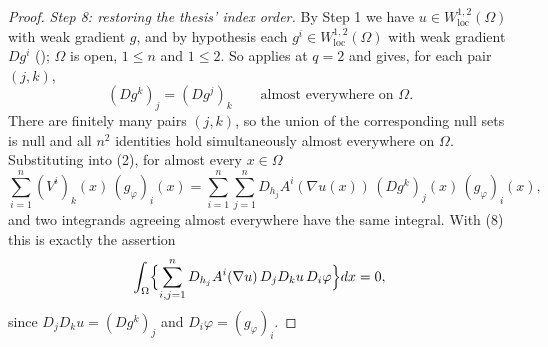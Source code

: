 \begin{proof}
\emph{Step 8: restoring the thesis' index order.}  By Step 1 we have
$u\in W^{1,2}_{\mathrm{loc}}(\Omega)$ with weak gradient $g$, and by hypothesis
each $g^i\in W^{1,2}_{\mathrm{loc}}(\Omega)$ with weak gradient $Dg^i$
(); $\Omega$ is open, $1\le n$ and $1\le2$.  So
 applies at $q=2$ and gives, for each pair
$(j,k)$,
\[
(Dg^k)_j=(Dg^j)_k\qquad\text{almost everywhere on }\Omega .
\]
There are finitely many pairs $(j,k)$, so the union of the corresponding null
sets is null and all $n^2$ identities hold simultaneously almost everywhere on
$\Omega$.  Substituting into (2), for almost every $x\in\Omega$
\[
\sum_{i=1}^n(V^i)_k(x)\,(g_\varphi)_i(x)
=\sum_{i=1}^n\sum_{j=1}^nD_{h_j}A^i(\nabla u(x))\,(Dg^k)_j(x)\,(g_\varphi)_i(x) ,
\]
and two integrands agreeing almost everywhere have the same integral.  With (8)
this is exactly the assertion
\[
\int_\Omega\Bigl\{\sum_{i,j=1}^nD_{h_j}A^i(\nabla u)\,D_jD_ku\,D_i\varphi\Bigr\}dx=0 ,
\]
since $D_jD_ku=(Dg^k)_j$ and $D_i\varphi=(g_\varphi)_i$.
\end{proof}

